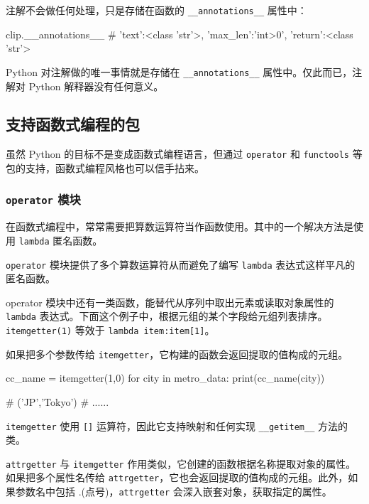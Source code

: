 注解不会做任何处理，只是存储在函数的 \texttt{\_\_annotations\_\_} 属性中：
\begin{python}
clip.__annotations__
# {'text':<class 'str'>, 'max_len':'int>0', 'return':<class 'str'>}
\end{python}

Python 对注解做的唯一事情就是存储在 \texttt{\_\_annotations\_\_} 属性中。仅此而已，注解对 Python 解释器没有任何意义。

\subsection{支持函数式编程的包}

虽然 Python 的目标不是变成函数式编程语言，但通过 \texttt{operator} 和 \texttt{functools} 等包的支持，函数式编程风格也可以信手拈来。

\subsubsection{\texttt{operator} 模块}

在函数式编程中，常常需要把算数运算符当作函数使用。其中的一个解决方法是使用 \texttt{lambda} 匿名函数。



\texttt{operator} 模块提供了多个算数运算符从而避免了编写 \texttt{lambda} 表达式这样平凡的匿名函数。



operator 模块中还有一类函数，能替代从序列中取出元素或读取对象属性的 \texttt{lambda} 表达式。下面这个例子中，根据元组的某个字段给元组列表排序。\texttt{itemgetter(1)} 等效于 \texttt{lambda item:item[1]}。



如果把多个参数传给 \texttt{itemgetter}，它构建的函数会返回提取的值构成的元组。

\begin{python}
cc_name = itemgetter(1,0)
for city in metro_data:
    print(cc_name(city))

# ('JP','Tokyo')
# ......
\end{python}

\texttt{itemgetter} 使用 \texttt{[]} 运算符，因此它支持映射和任何实现 \texttt{\_\_getitem\_\_} 方法的类。

\texttt{attrgetter} 与 \texttt{itemgetter} 作用类似，它创建的函数根据名称提取对象的属性。如果把多个属性名传给 \texttt{attrgetter}，它也会返回提取的值构成的元组。此外，如果参数名中包括 .(点号)，\texttt{attrgetter} 会深入嵌套对象，获取指定的属性。

